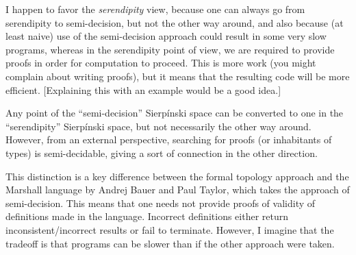 I happen to favor the \emph{serendipity} view, because one can always go from serendipity to semi-decision, but not the other way around, and also because (at least naive) use of the semi-decision approach could result in some very slow programs, whereas in the serendipity point of view, we are required to provide proofs in order for computation to proceed. This is more work (you might complain about writing proofs), but it means that the resulting code will be more efficient. [Explaining this with an example would be a good idea.]

Any point of the ``semi-decision'' Sierp\'inski space can be converted to one in the ``serendipity'' Sierp\'inski space, but not necessarily the other way around. However, from an external perspective, searching for proofs (or inhabitants of types) is semi-decidable, giving a sort of connection in the other direction. 

This distinction is a key difference between the formal topology approach and the Marshall language by Andrej Bauer and Paul Taylor, which takes the approach of semi-decision. This means that one needs not provide proofs of validity of definitions made in the language. Incorrect definitions either return inconsistent/incorrect results or fail to terminate. However, I imagine that the tradeoff is that programs can be slower than if the other approach were taken.

